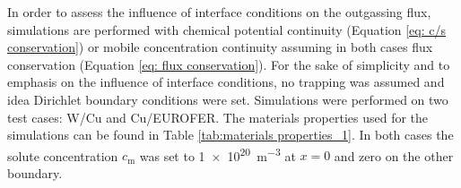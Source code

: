 
In order to assess the influence of interface conditions on the outgassing flux, simulations are performed with chemical potential continuity (Equation \ref{eq: c/s conservation}) or mobile concentration continuity assuming in both cases flux conservation (Equation \ref{eq: flux conservation}).
For the sake of simplicity and to emphasis on the influence of interface conditions, no trapping was assumed and idea Dirichlet boundary conditions were set.
Simulations were performed on two test cases: W/Cu and Cu/EUROFER.
The materials properties used for the simulations can be found in Table \ref{tab:materials properties_1}.
In both cases the solute concentration $c_\mathrm{m}$ was set to \SI{1e20}{m^{-3}} at $x=0$ and zero on the other boundary.
